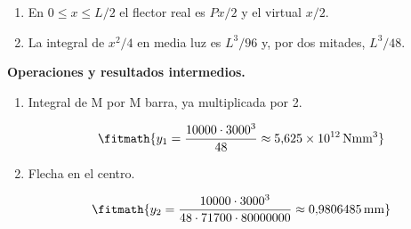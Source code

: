 \begin{enumerate}

\item En $0 \le x \le L/2$ el flector real es $Px/2$ y el virtual $x/2$.

\item La integral de $x^2/4$ en media luz es $L^3/96$ y, por dos mitades, $L^3/48$.

\end{enumerate}

\noindent\textbf{Operaciones y resultados intermedios.}

\begin{enumerate}

\item Integral de M por M barra, ya multiplicada por 2.

\[\fitmath{y_{1}=\frac{10000\cdot {3000}^{3}}{48}\approx 5{,}625\times10^{12}\,\mathrm{N mm^{3}}}\]

\item Flecha en el centro.

\[\fitmath{y_{2}=\frac{10000\cdot {3000}^{3}}{48\cdot 71700\cdot 80000000}\approx 0{,}9806485\,\mathrm{mm}}\]

\end{enumerate}
